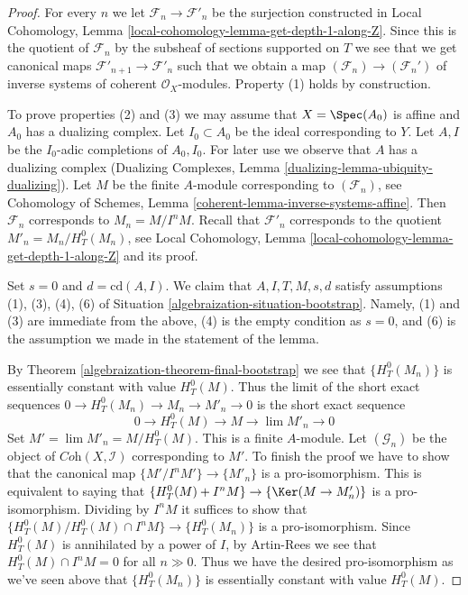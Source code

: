\begin{proof}

For every $n$ we let $\mathcal{F}_n \to \mathcal{F}'_n$ be the surjection
constructed in
Local Cohomology, Lemma \ref{local-cohomology-lemma-get-depth-1-along-Z}.
Since this is the quotient of $\mathcal{F}_n$ by the subsheaf
of sections supported on $T$ we see that we get canonical maps
$\mathcal{F}'_{n + 1} \to \mathcal{F}'_n$ such that we obtain
a map $(\mathcal{F}_n) \to (\mathcal{F}_n')$
of inverse systems of coherent $\mathcal{O}_X$-modules.
Property (1) holds by construction.

\medskip\noindent
To prove properties (2) and (3) we may assume that $X = \Spec(A_0)$ is
affine and $A_0$ has a dualizing complex. Let $I_0 \subset A_0$ be the
ideal corresponding to $Y$. Let $A, I$ be the $I_0$-adic completions of
$A_0, I_0$. For later use we observe that $A$ has a dualizing complex
(Dualizing Complexes, Lemma \ref{dualizing-lemma-ubiquity-dualizing}).
Let $M$ be the finite $A$-module corresponding to $(\mathcal{F}_n)$, see
Cohomology of Schemes, Lemma \ref{coherent-lemma-inverse-systems-affine}.
Then $\mathcal{F}_n$ corresponds to $M_n = M/I^nM$. Recall that
$\mathcal{F}'_n$ corresponds to the quotient $M'_n = M_n / H^0_T(M_n)$,
see Local Cohomology, Lemma \ref{local-cohomology-lemma-get-depth-1-along-Z}
and its proof.

\medskip\noindent
Set $s = 0$ and $d = \text{cd}(A, I)$.
We claim that $A, I, T, M, s, d$ satisfy assumptions (1), (3), (4), (6)
of Situation \ref{algebraization-situation-bootstrap}.
Namely, (1) and (3) are immediate from the above, (4) is
the empty condition as $s = 0$, and (6) is the assumption
we made in the statement of the lemma.

\medskip\noindent
By Theorem \ref{algebraization-theorem-final-bootstrap} we see that $\{H^0_T(M_n)\}$
is essentially constant with value $H^0_T(M)$. Thus the limit of the
short exact sequences $0 \to H^0_T(M_n) \to M_n \to M'_n \to 0$
is the short exact sequence
$$
0 \to H^0_T(M) \to M \to \lim M'_n \to 0
$$
Set $M' = \lim M'_n = M/H^0_T(M)$. This is a finite $A$-module.
Let $(\mathcal{G}_n)$ be the object of $\textit{Coh}(X, \mathcal{I})$
corresponding to $M'$. To finish the proof we have to show that the
canonical map $\{M'/I^nM'\} \to \{M'_n\}$ is a pro-isomorphism.
This is equivalent to saying that
$\{H^0_T(M) + I^nM\} \to \{\Ker(M \to M'_n)\}$ is a
pro-isomorphism. Dividing by $I^nM$ it suffices to show that
$\{H^0_T(M)/H^0_T(M) \cap I^nM\} \to \{H^0_T(M_n)\}$
is a pro-isomorphism. Since $H^0_T(M)$ is annihilated by a power
of $I$, by Artin-Rees we see that $H^0_T(M) \cap I^nM = 0$
for all $n \gg 0$. Thus we have the desired pro-isomorphism
as we've seen above that $\{H^0_T(M_n)\}$
is essentially constant with value $H^0_T(M)$.
\end{proof}

